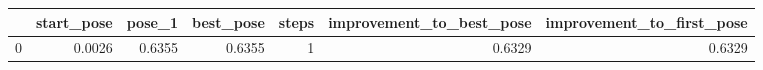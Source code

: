 \begin{tabular}{lrrrrrr}
\toprule
{} &  start\_pose &  pose\_1 &  best\_pose &  steps &  improvement\_to\_best\_pose &  improvement\_to\_first\_pose \\
\midrule
0 &      0.0026 &  0.6355 &     0.6355 &      1 &                    0.6329 &                     0.6329 \\
\bottomrule
\end{tabular}

